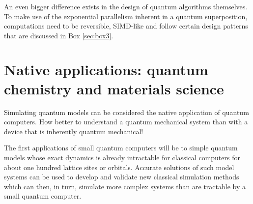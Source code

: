 \documentclass[journal]{IEEEtran}
\begin{document}
 An even bigger difference exists in the design of quantum algorithms themselves. To make use of the  exponential parallelism inherent in a quantum superposition, computations need to be reversible, SIMD-like and follow certain design patterns that are discussed in Box \ref{sec:box3}.   %
 
 
 



\section{Native applications: quantum chemistry and materials science}

Simulating quantum models can be considered the native application of quantum computers. How better to understand a quantum mechanical system than with a device that is inherently quantum mechanical! %

The first applications of small quantum computers will be to simple quantum models whose exact dynamics is already intractable for classical computers for about one hundred lattice sites or orbitals.  Accurate solutions of such model systems can be used to develop and validate new classical simulation methods which can then, in turn, simulate more complex systems than are tractable by a small quantum computer. 
\end{document}
